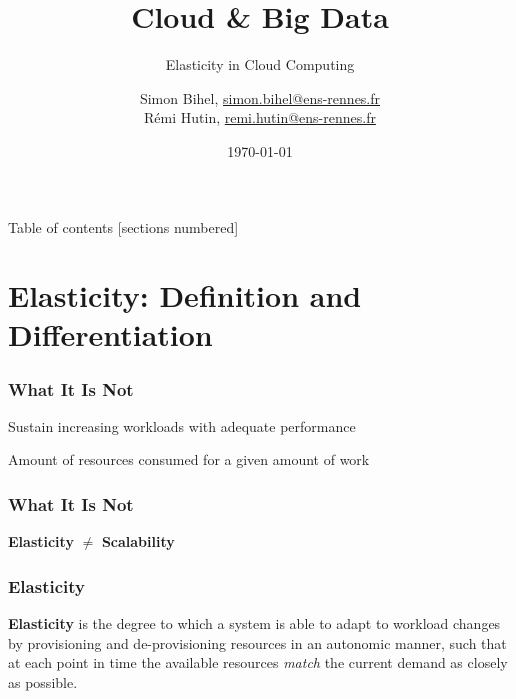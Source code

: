 \documentclass{beamer}
\title{Cloud \& Big Data}
\subtitle{Elasticity in Cloud Computing}
\date{\today}
\author{%
  Simon Bihel, \url{simon.bihel@ens-rennes.fr} \\
  Rémi Hutin, \url{remi.hutin@ens-rennes.fr}
}
\institute{%
  University of Rennes I \\
  École normale supérieure de Rennes
}
\begin{document}
\maketitle

\begin{frame}{Table of contents}
  [sections numbered]
  \tableofcontents[hideallsubsections]
\end{frame}


\section{Elasticity: Definition and Differentiation}
\begin{frame}
  \frametitle{What It Is Not~\cite{herbst2013elasticity}}
  \begin{description}
    \parbox{\linewidth}{
    \item[Scalability] Sustain increasing workloads with adequate performance
    \item[Efficiency] Amount of resources consumed for a given amount of work
    }
  \end{description}
\end{frame}


\begin{frame}
  \frametitle{What It Is Not~\cite{herbst2013elasticity}}
  \centering
  \Large\textbf{Elasticity} $\neq$ \textbf{Scalability}
\end{frame}

\begin{frame}
  \frametitle{Elasticity~\cite{herbst2013elasticity}~\cite{galante2012survey}~\cite{gulati2011cloud}~\cite{sharma2011cost}~\cite{moore2013coordinated}}
  \begin{definition}
  \parbox{\linewidth}{\textbf{Elasticity} is the degree to which a system is able to adapt to
    workload changes by provisioning and de-provisioning resources in an
    autonomic manner, such that at each point in time the available resources
    \textit{match} the current demand as closely as possible.
  }
  \end{definition}
\end{frame}
\end{document}
